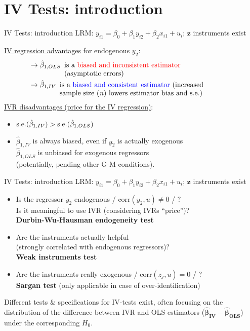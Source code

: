 \documentclass[usenames,dvipsnames]{beamer}
\begin{document}
\section{IV Tests: introduction}
\begin{frame}{IV Tests: introduction}
LRM: $y_{i1}=\beta_0+\beta_1 y_{i2}+\beta_2 x_{i1}+u_i$; \quad $\bm{z}$ instruments exist \\
\vspace{0.3cm}

\underline{IV regression advantages} for endogenous $y_2$:
\vspace{-0.2cm}
\begin{align*}
& \rightarrow \hat{\beta}_{1,OLS} \enspace \parbox[t]{24em}{ is a \textcolor{red}{biased and inconsistent estimator} \\(asymptotic errors)}\\
 & \rightarrow \hat{\beta}_{1, IV} \enspace \parbox[t]{24em}{ is a \textcolor{blue}{biased and consistent estimator} (increased \\sample size (\textit{n}) lowers estimator bias and s.e.)} 
\end{align*}
\underline{IVR disadvantages (price for the IV regression)}:
\begin{itemize}
\item $\textnormal{s.e.}(\hat{\beta}_{1, IV}) > \textnormal{s.e.}(\hat{\beta}_{1, OLS})$
\item $\hat{\beta}_{1, IV}$ is always biased, even if $y_2$ is actually exogenous\\
$\hat{\beta}_{1, OLS}$ is unbiased for exogenous regressors \\ 
\small (potentially, pending other G-M conditions).
\end{itemize}
\end{frame}
\begin{frame}{IV Tests: introduction}
LRM: $y_{i1}=\beta_0+\beta_1 y_{i2}+\beta_2 x_{i1}+u_i$; \quad $\bm{z}$ instruments exist
\medskip
\begin{itemize}
\item Is the regressor $y_2$ endogenous / $\mathrm{corr}(y_2, u) \neq 0$ / ? \\
Is it meaningful to use IVR (considering IVRs ``price'')?\\
\textbf{Durbin-Wu-Hausman endogeneity test}\\
\item Are the instruments actually helpful\\
(strongly correlated with endogenous regressors)? \\
\textbf{Weak instruments test}\\
\item Are the instruments really exogenous / $\mathrm{corr}(z_j, u)=0$ / ?\\
\textbf{Sargan test} (only applicable in case of over-identification)\\
\end{itemize}
\medskip
\small Different tests \& specifications for IV-tests exist, often focusing on the distribution of the difference between IVR and OLS estimators ($\bm{\hat{\beta}_{IV}}-\bm{\hat{\beta}_{OLS}}$) under the corresponding $H_0$.
\end{frame}
\end{document}
